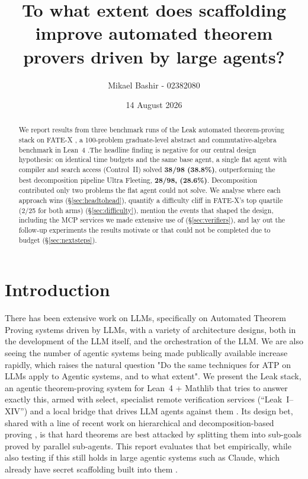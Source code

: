 \documentclass[12pt, a4paper]{article}
\title{\textbf{To what extent does scaffolding improve automated theorem
provers driven by large agents?}}
\author{Mikael Bashir - 02382080}
\date{14 August 2026}
\begin{document}
\maketitle

\begin{abstract}
\noindent
We report results from three benchmark runs of the Leak \cite{leakabout} automated
theorem-proving stack on FATE-X \cite{fatex2025}, a 100-problem graduate-level
abstract and commutative-algebra benchmark in Lean~4 \cite{demoura2021lean4}.The headline 
finding is negative for our central design hypothesis: on identical time budgets and the same base agent, a single
flat agent with compiler and search access (Control~II) solved
\textbf{38/98 (38.8\%)}, outperforming the best decomposition pipeline
Ultra Fleeting, \textbf{28/98, (28.6\%)}. Decomposition contributed only two problems
the flat agent could not solve. We analyse where each approach wins (\S\ref{sec:headtohead}), quantify a
difficulty cliff in FATE-X's top quartile (2/25 for both arms) (\S\ref{sec:difficulty}), mention
the events that shaped the design, including the MCP services we made
extensive use of (\S\ref{sec:verifiers}), and lay out the follow-up experiments the results motivate or
that could not be completed due to budget (\S\ref{sec:nextsteps}).
\end{abstract}

\tableofcontents
\newpage

\section{Introduction}

There has been extensive work on LLMs, specifically on Automated Theorem Proving systems 
driven by LLMs, with a variety of architecture designs, both in the development of the LLM itself,
and the orchestration of the LLM. We are also seeing the number of agentic systems being made publically available
increase rapidly, which raises the natural question "Do the same techniques for ATP on LLMs apply to Agentic systems, and to what extent". 
We present the Leak stack, an agentic theorem-proving system for Lean~4 + Mathlib
\cite{demoura2021lean4,mathlib2020} that tries to answer exactly this, armed with select, specialist remote verification services
(``Leak~I--XIV'') and a local bridge that drives LLM agents against them
\cite{competemath,hfspaces}. Its design bet, shared with a line of recent work
on hierarchical and decomposition-based proving
\cite{lample2022hypertree,deepseekproverv2,decomposition_openreview,davis2025goedelspoetry},
is that hard theorems are best attacked by splitting them into sub-goals proved
by parallel sub-agents. This report evaluates that bet empirically, while also 
testing if this still holds in large agentic systems such as Claude, which already have secret
scaffolding built into them \cite{anthropicharness}.
\end{document}
